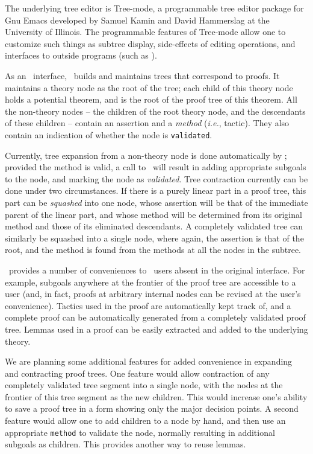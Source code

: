      The underlying tree editor is Tree-mode, a programmable tree editor
package for Gnu Emacs developed by Samuel Kamin and David Hammerslag at
the University of Illinois.  The programmable features of Tree-mode allow
one to customize such things as subtree display, side-effects of editing
operations, and interfaces to outside programs (such as \HOL).

     As an \HOL\ interface, \PM\ builds and maintains trees that correspond to
proofs.  It maintains a theory node as the root of the tree; each child
of this theory node holds a potential theorem, and is the root of the
proof tree of this theorem.  All the non-theory nodes -- the children of
the root theory node, and the descendants of these children -- contain an
assertion and a {\it method} ({\it i.e.}, tactic).  They also contain an
indication of whether the node is {\tt validated}.

     Currently, tree expansion from a non-theory node is done automatically
by \PM; provided the method is valid, a call to \HOL\ will result in adding
appropriate subgoals to the node, and marking the node as {\it validated}.
Tree contraction currently can be done under two circumstances.  If there
is a purely linear part in a proof tree, this part can be {\it squashed\/} into
one node, whose assertion will be that of the immediate parent of the linear
part, and whose method will be determined from its original method and those
of its eliminated descendants.  A completely validated tree can similarly be
squashed into a single node, where again, the assertion is that of the root,
and the method is found from the methods at all the nodes in the subtree.

     \PM\ provides a number of conveniences to \HOL\ users absent in
the original
interface.  For example, subgoals anywhere at the frontier of the proof tree
are accessible to a user (and, in fact, proofs at arbitrary internal nodes
can be revised at the user's convenience).  Tactics used in the proof are
automatically kept track of, and a complete proof can be automatically
generated from a completely validated proof tree.  Lemmas used in a proof
can be easily extracted and added to the underlying theory.

     We are planning some additional features for added convenience in
expanding and contracting proof trees.  One feature would allow contraction
of any completely validated tree segment into a single node, with the nodes
at the frontier of this tree segment as the new children.  This would increase
one's ability to save a proof tree in a form showing only the major decision
points.  A second feature would allow one to add children to a node by hand,
and then use an appropriate {\tt method} to validate the node,
normally resulting in additional subgoals as children.  This provides
another way to reuse lemmas.

